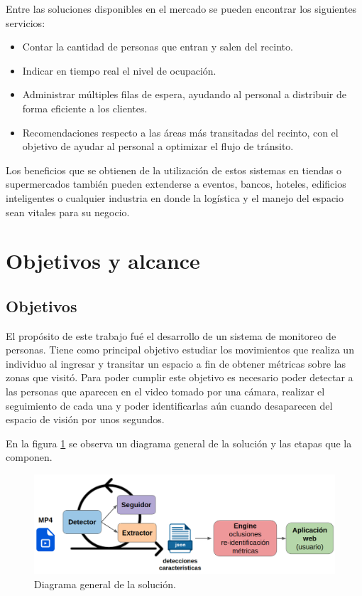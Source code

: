 Entre las soluciones disponibles en el mercado se pueden encontrar los siguientes servicios:
\begin{itemize}
\item Contar la cantidad de personas que entran y salen del recinto.
\item Indicar en tiempo real el nivel de ocupación.
\item Administrar múltiples filas de espera, ayudando al personal a distribuir de forma eficiente a los clientes.
\item Recomendaciones respecto a las áreas más transitadas del recinto, con el objetivo de ayudar al personal a optimizar el flujo de tránsito.
\end{itemize}

Los beneficios que se obtienen de la utilización de estos sistemas en tiendas o supermercados también pueden extenderse a eventos, bancos, hoteles, edificios inteligentes o cualquier industria en donde la logística y el manejo del espacio sean vitales para su negocio.


\section{Objetivos y alcance}
\label{sec:objetivosAlcance}

\subsection{Objetivos}

El propósito de este trabajo fué el desarrollo de un sistema de monitoreo de personas. Tiene como principal objetivo estudiar los movimientos que realiza un individuo al ingresar y transitar un espacio a fin de obtener métricas sobre las zonas que visitó. Para poder cumplir este objetivo es necesario poder detectar a las personas que aparecen en el video tomado por una cámara, realizar el seguimiento de cada una y poder identificarlas aún cuando desaparecen del espacio de visión por unos segundos.

En la figura \ref{fig:esquemaGeneral} se observa un diagrama general de la solución y las etapas que la componen.

\begin{figure}[ht]
	\centering
	\includegraphics[scale=.6]{./Figures/esquemaGeneral.png}
	\caption{Diagrama general de la solución.}
	\label{fig:esquemaGeneral}
\end{figure}

